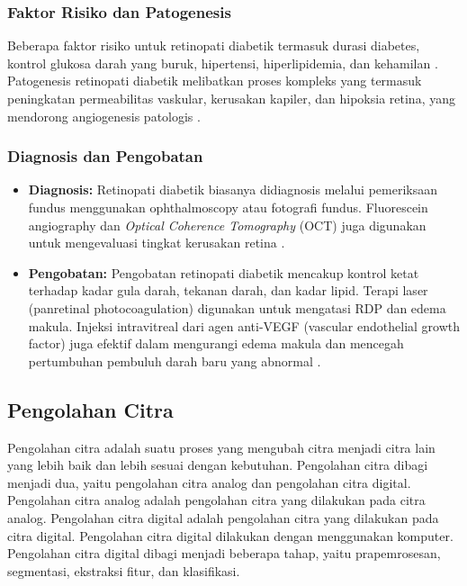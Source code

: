 \subsubsection{Faktor Risiko dan Patogenesis}

Beberapa faktor risiko untuk retinopati diabetik termasuk durasi diabetes, kontrol glukosa darah yang buruk, hipertensi, hiperlipidemia, dan kehamilan \parencite{fong2004diabetic}. Patogenesis retinopati diabetik melibatkan proses kompleks yang termasuk peningkatan permeabilitas vaskular, kerusakan kapiler, dan hipoksia retina, yang mendorong angiogenesis patologis \parencite{antonetti2012diabetic}.

\subsubsection{Diagnosis dan Pengobatan}

\begin{itemize}
    \item \textbf{Diagnosis:} Retinopati diabetik biasanya didiagnosis melalui pemeriksaan fundus menggunakan ophthalmoscopy atau fotografi fundus. Fluorescein angiography dan \emph{Optical Coherence Tomography} (OCT) juga digunakan untuk mengevaluasi tingkat kerusakan retina \parencite{browning2008optical}.
    \item \textbf{Pengobatan:} Pengobatan retinopati diabetik mencakup kontrol ketat terhadap kadar gula darah, tekanan darah, dan kadar lipid. Terapi laser (panretinal photocoagulation) digunakan untuk mengatasi RDP dan edema makula. Injeksi intravitreal dari agen anti-VEGF (vascular endothelial growth factor) juga efektif dalam mengurangi edema makula dan mencegah pertumbuhan pembuluh darah baru yang abnormal \parencite{ciulla2003intravitreal}.
\end{itemize}

\subsection{Pengolahan Citra}
\label{sec:221}

Pengolahan citra adalah suatu proses yang mengubah citra menjadi citra lain yang lebih baik dan lebih sesuai dengan kebutuhan. Pengolahan citra dibagi menjadi dua, yaitu pengolahan citra analog dan pengolahan citra digital. Pengolahan citra analog adalah pengolahan citra yang dilakukan pada citra analog. Pengolahan citra digital adalah pengolahan citra yang dilakukan pada citra digital. Pengolahan citra digital dilakukan dengan menggunakan komputer. Pengolahan citra digital dibagi menjadi beberapa tahap, yaitu prapemrosesan, segmentasi, ekstraksi fitur, dan klasifikasi.

